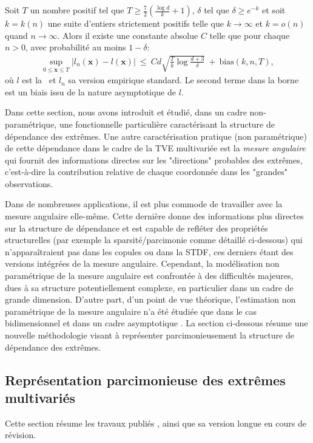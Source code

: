 \begin{theoreme}
\label{resume_fr:thm:l}
Soit $T$ un nombre positif tel que $T \ge \frac{7}{2}(\frac{\log d}{k} + 1)$, $\delta$ tel que $\delta \ge e^{-k}$ et soit $k=k(n)$ une suite d'entiers strictement positifs telle que $k \to \infty$ et $k=o(n)$ quand $n \to \infty$. 
Alors il existe une constante absolue $ C $ telle que pour chaque $ n> 0 $, avec probabilité au moins $ 1- \delta $:
\begin{align*}
\sup_{0 \le \mathbf{x} \le T} \left| l_n(\mathbf{x}) - l(\mathbf{x}) \right| ~\le~ Cd\sqrt{\frac{T}{k}\log\frac{d+3}{\delta}} ~+~
\text{bias}(k, n, T),
\end{align*}
où $ l $ est la \stdf~et $ l_n $ sa version empirique standard. Le second terme dans la borne est un biais issu de la nature asymptotique de $ l $.
\end{theoreme}


Dans cette section, nous avons introduit et étudié, dans un cadre non-paramétrique, une fonctionnelle particulière caractérisant la structure de dépendance des extrêmes.
%
Une autre caractérisation pratique (non paramétrique) de cette dépendance dans le cadre de la TVE multivariée est la \textit{mesure angulaire} qui fournit des informations directes sur les "directions" probables des extrêmes, c'est-à-dire la contribution relative de chaque coordonnée dans les "grandes" observations.

Dans de nombreuses applications, il est plus commode de travailler avec la mesure angulaire elle-même. Cette dernière donne des informations plus directes sur la structure de dépendance et est capable de refléter des propriétés structurelles (par exemple la sparsité/parcimonie comme détaillé ci-dessous) qui n'apparaîtraient pas dans les copules ou dans la STDF, ces derniers étant des versions intégrées de la mesure angulaire.
Cependant, la modélisation non paramétrique de la mesure angulaire est confrontée à des difficultés majeures, dues à sa structure potentiellement complexe, en particulier dans un cadre de grande dimension.
D'autre part, d'un point de vue théorique, l'estimation non paramétrique de la mesure angulaire n'a été étudiée que dans le cas bidimensionnel et dans un cadre asymptotique \cite{Einmahl2001, Einmahl2009}. La section ci-dessous résume une nouvelle méthodologie visant à représenter parcimonieusement la structure de dépendance des extrêmes.


\subsection{Représentation parcimonieuse des extrêmes multivariés}
\label{resume_fr:sec:JMVA}
Cette section résume les travaux publiés \cite{AISTAT16}, ainsi que sa version longue \cite{ARXIV16} en cours de révision.

